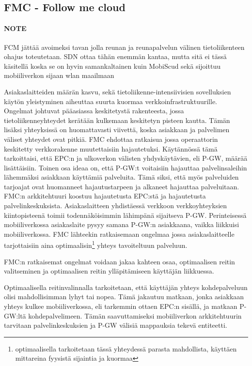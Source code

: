 \subsection{FMC - Follow me cloud} \label{fmc}
\paragraph{NOTE} FCM jättää avoimeksi tavan jolla reunan ja reunapalvelun välinen tietoliikenteen ohajus toteutetaan. SDN ottaa tähän enemmän kantaa, mutta sitä ei tässä käsitellä koska se on hyvin samankaltainen kuin MobiScud sekä sijoittuu mobiiliverkon sijaan wlan maailmaan

Asiakaslaitteiden määrän kasvu, sekä tietoliikenne-intensiivisien sovelluksien käytön yleistyminen aiheuttaa suurta kuormaa verkkoinfrastruktuurille. Ongelmat johtuvat pääasiassa keskitetystä rakenteesta, jossa tietoliikenneyhteydet kerätään kulkemaan keskitetyn pisteen kautta. Tämän lisäksi yhteyksissä on huomattavasti viivettä, koska asiakkaan ja palvelimen väliset yhteydet ovat pitkiä. FMC ehdottaa ratkaisua jossa operaattorin keskitetty verkkorakenne muutettaisiin hajautetuksi. \cite{taleb2013follow}
Käytännössä tämä tarkoittaisi, että EPC:n ja ulkoverkon välisten yhdyskäytävien, eli P-GW, määrää lisättäisiin. 
Toinen osa ideaa on, että P-GW:t voitaisiin hajauttaa palvelinsaleihin lähemmäksi asiakkaan käyttämiä palveluita. Tämä siksi, että myös palveluiden tarjoajat ovat huomanneet hajautustarpeen ja alkaneet hajauttaa palveluitaan. 
FMC:n arkkitehtuuri koostuu hajautetusta EPC:stä ja hajautetusta palvelinkeskuksista. Asiakaslaitteen yhdistäessä verkkoon verkkoyhteyksien kiintopisteenä toimii todennäköisimmin lähimpänä sijaitseva P-GW. Perinteisessä mobiiliverkossa asiakaslaite pysyy samana P-GW:n asiakkaana, vaikka liikkuisi mobiiliverkossa. FMC lähteekin ratkaisemaan ongelmaa jossa asiakaslaitteelle tarjottaisiin aina optimaalisin\footnote{optimaalisella tarkoitetaan tässä yhteydessä parasta mahdollista, käyttäen mittareina fyysistä sijaintia ja kuormaa} yhteys tavoiteltuun palveluun.

FMC:n ratkaisemat ongelmat voidaan jakaa kahteen osaa, optimaalisen reitin valitseminen ja optimaalisen reitin ylläpitämiseen käyttäjän liikkuessa. 

Optimaalisella reitinvalinnalla tarkoitetaan, että käyttäjän yhteys kohdepalveluun olisi mahdollisimman lyhyt tai nopea. Tämä jakautuu matkaan, jonka asiakkaan yhteys kulkee mobiiliverkossa, eli tarkemmin ottaen EPC:n sisällä, ja matkaan P-GW:ltä kohdepalvelimeen. Tämän saavuttamiseksi mobiiliverkon arkkitehtuurin tarvitaan palvelinkeskuksien ja P-GW välisiä mappauksia tekevä entiteetti. 

